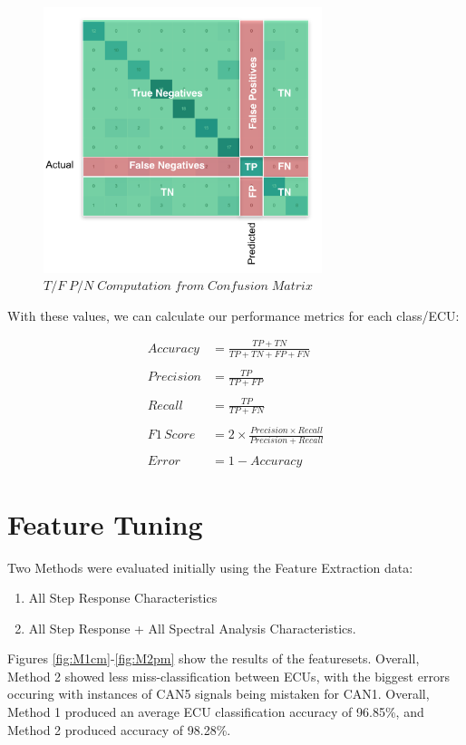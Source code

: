 \documentclass[conference]{IEEEtran}
\begin{document}
\begin{figure}[htb]
\centering
\includegraphics[width=3.2in]{figures/60_cm_pm.png}
\caption{$T/F  \; P/N \; Computation  \; from \; Confusion \; Matrix$ \cite{bell2020}}
\label{fig:CMPerfMetric}
\end{figure}

With these values, we can calculate our performance metrics for each class/ECU:

\begin{align*}
    Accuracy & = \frac{TP + TN}{TP + TN + FP + FN}\\\\
    Precision & = \frac{TP}{TP + FP}\\\\
    Recall & = \frac{TP}{TP + FN}\\\\
    F1\,Score & = 2 \times \frac{Precision \times Recall}{Precision + Recall}\\\\
    Error & = 1 - Accuracy
\end{align*}

\section{Feature Tuning}
Two Methods were evaluated initially using the Feature Extraction data:
\begin{enumerate}
    \item All Step Response Characteristics
    \item All Step Response + All Spectral Analysis Characteristics. 
\end{enumerate}
Figures \ref{fig:M1cm}-\ref{fig:M2pm} show the results of the featuresets. Overall, Method 2 showed less miss-classification between ECUs, with the biggest errors occuring with instances of CAN5 signals being mistaken for CAN1. Overall, Method 1 produced an average ECU classification accuracy of 96.85\%, and Method 2 produced accuracy of 98.28\%.
\end{document}
